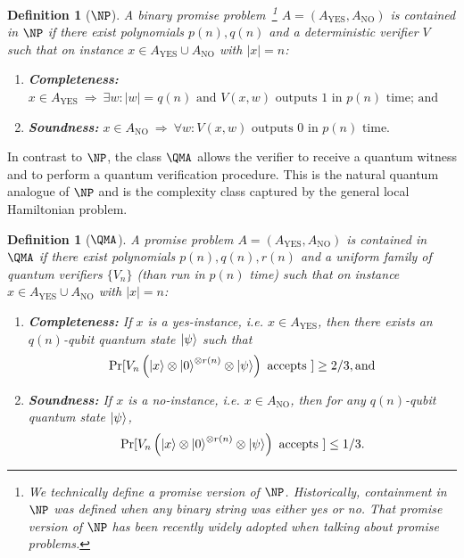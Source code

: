 \documentclass[a4paper,onecolumn,11pt]{quantumarticle}
\theoremstyle{plain}
\newtheorem{definition}[theorem]{Definition}
\begin{document}
\begin{definition}[$\NP$]
   A binary promise problem~\footnote{We technically define a promise version of $\NP$. Historically, containment in $\NP$ was defined when any binary string was either yes or no. That promise version of $\NP$ has been recently widely adopted when talking about promise problems.} $A = \left(A_{\mathrm{YES}}, A_{\mathrm{NO}}\right)$ is contained in $\NP$ if there exist polynomials $p(n), q(n)$ and a deterministic verifier $V$ such that on instance $x \in A_{\mathrm{YES}} \cup A_{\mathrm{NO}}$ with $|x| = n$:
    \begin{enumerate}
        \item \textbf{Completeness:} $x \in A_{\mathrm{YES}} \: \Longrightarrow \: \exists w: |w| = q(n) \text{ and } V(x, w) \text{ outputs } 1 \text{ in } p(n) \text{ time; and}$
        \item \textbf{Soundness:} $ x \in A_{\mathrm{NO}} \: \Longrightarrow \: \forall w: V(x, w) \text{ outputs } 0 \text{ in } p(n) \text{ time.}$
    \end{enumerate}
\end{definition}

In contrast to $\NP$, the class $\QMA$ allows the verifier to receive a quantum witness and to perform a quantum verification procedure.  This is the natural quantum analogue of $\NP$ and is the complexity class captured by the general local Hamiltonian problem.

\begin{definition}[$\QMA$]
   A promise problem $A = \left(A_{\mathrm{YES}}, A_{\mathrm{NO}}\right)$ is contained in $\QMA$ if there exist polynomials $p(n), q(n), r(n)$ and a uniform family of quantum verifiers $\{V_n\}$ (than run in $p(n)$ time) such that on instance $x \in A_{\mathrm{YES}} \cup A_{\mathrm{NO}}$ with $|x| = n$:
    \begin{enumerate}
        \item \textbf{Completeness:} If $x$ is a yes-instance, i.e. $x \in A_{\mathrm{YES}}$, then there exists an $q(n)$-qubit quantum state $\ket{\psi}$ such that
        \begin{equation}
            \Pr[V_n\left(\ket{x} \otimes \ket{0}^{\otimes r(n)} \otimes \ket{\psi}\right) \text{ accepts } ] \geq 2/3, \text{and}
        \end{equation}
        \item \textbf{Soundness:} If $x$ is a no-instance, i.e. $x \in A_{\mathrm{NO}}$, then for any $q(n)$-qubit quantum state $\ket{\psi}$, 
        \begin{equation}
            \Pr[V_n\left(\ket{x} \otimes \ket{0}^{\otimes r(n)} \otimes \ket{\psi}\right) \text{ accepts }] \leq 1/3.
        \end{equation}
    \end{enumerate}
\end{definition}
\end{document}
